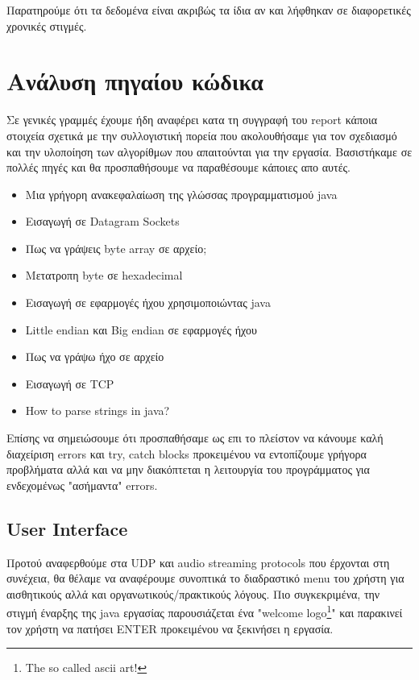 \documentclass[hidelinks, 12pt, a4paper]{article}
\begin{document}
Παρατηρούμε ότι τα δεδομένα είναι ακριβώς τα ίδια αν και λήφθηκαν σε διαφορετικές χρονικές στιγμές.

\section{Ανάλυση πηγαίου κώδικα}

Σε γενικές γραμμές έχουμε ήδη αναφέρει κατα τη συγγραφή του report κάποια στοιχεία σχετικά με την συλλογιστική πορεία που ακολουθήσαμε για τον σχεδιασμό και την υλοποίηση των αλγορίθμων που απαιτούνται για την εργασία. Βασιστήκαμε σε πολλές πηγές και θα προσπαθήσουμε να παραθέσουμε κάποιες απο αυτές.

\begin{itemize}
    \item Μια γρήγορη ανακεφαλαίωση της γλώσσας προγραμματισμού java \cite{derek}
    \item Εισαγωγή σε Datagram Sockets \cite{romaniancoder, oracle}
    \item Πως να γράψεις byte array σε αρχείο; \cite{javafile}
    \item Μετατροπη byte σε hexadecimal \cite{programizhex}
    \item Εισαγωγή σε εφαρμογές ήχου χρησιμοποιώντας java \cite{oraclesound}
    \item Little endian και Big endian σε εφαρμογές ήχου \cite{stackendian}
    \item Πως να γράψω ήχο σε αρχείο \cite{stackaudiofile}
    \item Εισαγωγή σε TCP \cite{tutorpoints, mediumtcp, codejava}
    \item How to parse strings in java? \cite{stackparsestring}
\end{itemize}


Επίσης να σημειώσουμε ότι προσπαθήσαμε ως επι το πλείστον να κάνουμε καλή διαχείριση errors και try, catch blocks προκειμένου να εντοπίζουμε γρήγορα προβλήματα αλλά και να μην διακόπτεται η λειτουργία του προγράμματος για ενδεχομένως "ασήμαντα" errors.

\subsection{User Interface}

Προτού αναφερθούμε στα UDP και audio streaming protocols που έρχονται στη συνέχεια, θα θέλαμε να αναφέρουμε συνοπτικά το διαδραστικό menu του χρήστη για αισθητικούς αλλά και οργανωτικούς/πρακτικούς λόγους. Πιο συγκεκριμένα, την στιγμή έναρξης της java εργασίας παρουσιάζεται ένα "welcome logo\footnote{The so called ascii art!}" και παρακινεί τον χρήστη να πατήσει ENTER προκειμένου να ξεκινήσει η εργασία.
\end{document}
